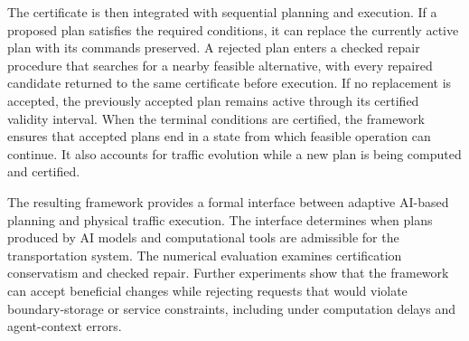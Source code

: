 \documentclass[preprint,12pt]{elsarticle}
\begin{document}
The certificate is then integrated with sequential planning and execution.
If a proposed plan satisfies the required conditions, it can replace the
currently active plan with its commands preserved. A rejected plan enters a
checked repair procedure that searches for a nearby feasible alternative,
with every repaired candidate returned to the same certificate before
execution. If no replacement is accepted, the previously accepted plan
remains active through its certified validity interval. When the terminal
conditions are certified, the framework ensures that accepted plans end in a
state from which feasible operation can continue. It also accounts for
traffic evolution while a new plan is being computed and certified.

The resulting framework provides a formal interface between adaptive
AI-based planning and physical traffic execution. The interface determines
when plans produced by AI models and computational tools are admissible for
the transportation system. The numerical evaluation examines certification
conservatism and checked repair. Further experiments show that the framework
can accept beneficial changes while rejecting requests that would violate
boundary-storage or service constraints, including under computation delays
and agent-context errors.
\end{document}
